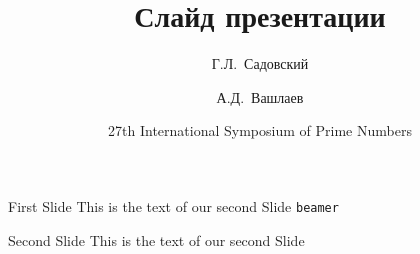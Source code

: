 \documentclass[aspectratio=169]{beamer} %
\begin{document}
\title{Слайд презентации}
\subtitle{}
\author[Садовский, Вашлаев]
{Г.Л.~Садовский \and А.Д.~Вашлаев}


\date[ISPN ’80]{27th International Symposium of Prime Numbers}


    
\begin{frame}{}
\titlepage
\end{frame}

\begin{frame}[c]{First Slide}
    This is the text of our second Slide \texttt{beamer}
\end{frame}

\begin{frame}{Second Slide}
    This is the text of our second Slide
\end{frame}
\end{document}
